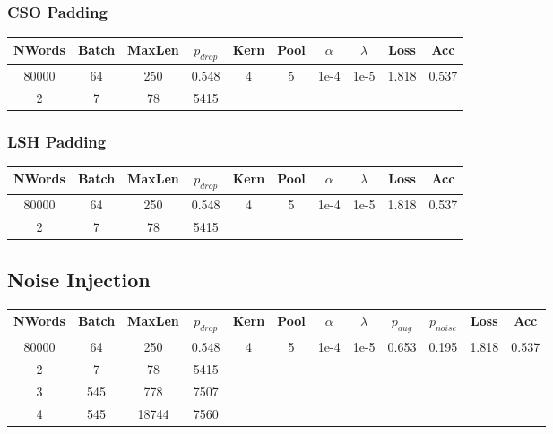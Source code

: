 \subsubsection{CSO Padding}
\begin{center}\begin{tabular}{||c c c c c c c c c c ||}
 \hline
 NWords & Batch & MaxLen & $p_{drop}$ & Kern & Pool & $\alpha$ & $\lambda$ &  Loss & Acc\\ [0.5ex]
 \hline\hline
 80000 & 64 & 250 & 0.548 & 4 & 5 & 1e-4 & 1e-5 & 1.818 & 0.537\\
 \hline
 2 & 7 & 78 & 5415 \\
 [1ex]\hline\end{tabular}\end{center}
\subsubsection{LSH Padding}
\begin{center}\begin{tabular}{||c c c c c c c c c c ||}
 \hline
 NWords & Batch & MaxLen & $p_{drop}$ & Kern & Pool & $\alpha$ & $\lambda$ &  Loss & Acc\\ [0.5ex]
 \hline\hline
 80000 & 64 & 250 & 0.548 & 4 & 5 & 1e-4 & 1e-5 & 1.818 & 0.537\\
 \hline
 2 & 7 & 78 & 5415 \\
 [1ex]\hline\end{tabular}\end{center}

\subsection{Noise Injection}
\begin{center}
 \begin{tabular}{||c c c c c c c c c c c c||}
 \hline
 NWords & Batch & MaxLen & $p_{drop}$ & Kern & Pool & $\alpha$ & $\lambda$ & $p_{aug}$ & $p_{noise}$ & Loss & Acc\\ [0.5ex]
 \hline\hline
 80000 & 64 & 250 & 0.548 & 4 & 5 & 1e-4 & 1e-5 & 0.653 & 0.195 & 1.818 & 0.537\\
 \hline
 2 & 7 & 78 & 5415 \\
 \hline
 3 & 545 & 778 & 7507 \\
 \hline
 4 & 545 & 18744 & 7560 \\[1ex]
 \hline
\end{tabular}
\end{center}
